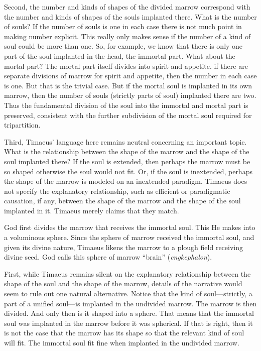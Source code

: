Second, the number and kinds of shapes of the divided marrow correspond with the number and kinds of shapes of the souls implanted there. What is the number of souls? If the number of souls is one in each case there is not much point in making number explicit. This really only makes sense if the number of a kind of soul could be more than one. So, for example, we know that there is only one part of the soul implanted in the head, the immortal part. What about the mortal part? The mortal part itself divides into spirit and appetite. if there are separate divisions of marrow for spirit and appetite, then the number in each case is one. But that is the trivial case. But if the mortal soul is implanted in its own marrow, then the number of souls (strictly parts of soul) implanted there are two. Thus the fundamental division of the soul into the immortal and mortal part is preserved, consistent with the further subdivision of the mortal soul required for tripartition.

Third, Timaeus' language here remains neutral concerning an important topic. What is the relationship between the shape of the marrow and the shape of the soul implanted there? If the soul is extended, then perhaps the marrow must be so shaped otherwise the soul would not fit. Or, if the soul is inextended, perhaps the shape of the marrow is modeled on an inextended paradigm. Timaeus does not specify the explanatory relationship, such as efficient or paradigmatic causation, if any, between the shape of the marrow and the shape of the soul implanted in it. Timaeus merely claims that they match.

God first divides the marrow that receives the immortal soul. This He makes into a voluminous sphere. Since the sphere of marrow received the immortal soul, and given its divine nature, Timaeus likens the marrow to a plough field receiving divine seed. God calls this sphere of marrow ``brain'' (\emph{engkephalon}).

First, while Timaeus remains silent on the explanatory relationship between the shape of the soul and the shape of the marrow, details of the narrative would seem to rule out one natural alternative. Notice that the kind of soul---strictly, a part of a unified soul---is implanted in the undivided marrow. The marrow is then divided. And only then is it shaped into a sphere. That means that the immortal soul was implanted in the marrow before it was spherical. If that is right, then it is not the case that the marrow has its shape so that the relevant kind of soul will fit. The immortal soul fit fine when implanted in the undivided marrow.

